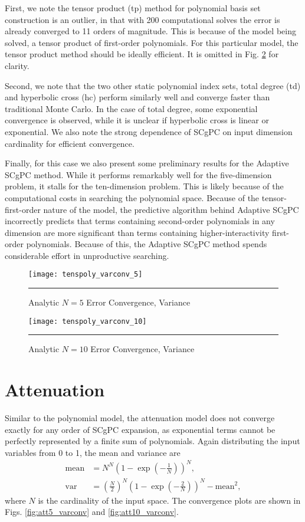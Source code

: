 First, we note the tensor product (tp) method for polynomial basis set construction is an outlier, in that
with 200 computational solves the error is already converged to 11 orders of magnitude.  This is because of
the model being solved, a tensor product of first-order polynomials.  For this particular
model, the tensor product method should be ideally efficient.  It is omitted in Fig.
\ref{fig:anl10_varconv} for clarity.

Second, we note that the two other static polynomial index sets, total degree (td) and hyperbolic cross (hc)
perform similarly well and converge faster than traditional Monte Carlo.  In the case of total degree, some
exponential convergence is observed, while it is unclear if hyperbolic cross is linear or exponential.  We
also note the strong dependence of SCgPC on input dimension cardinality for efficient convergence.

Finally, for this case we
also present some preliminary results for the Adaptive SCgPC method.  While it performs remarkably well for
the five-dimension problem, it stalls for the ten-dimension problem.  This is likely because of the
computational costs in searching the polynomial space.  Because of the tensor-first-order nature of the model,
the predictive algorithm behind Adaptive SCgPC incorrectly predicts that terms containing second-order
polynomials in any dimension are more significant than terms containing higher-interactivity first-order
polynomials.  Because of this, the Adaptive SCgPC method spends considerable effort in unproductive searching.

\begin{figure}[H]
  \centering
    \texttt{[image: tenspoly\_varconv\_5]}
    \rule{35em}{0.5pt}
  \caption{Analytic $N=5$ Error Convergence, Variance}
  \label{fig:anl5_varconv}
\end{figure}
\begin{figure}[H]
  \centering
    \texttt{[image: tenspoly\_varconv\_10]}
    \rule{35em}{0.5pt}
  \caption{Analytic $N=10$ Error Convergence, Variance}
  \label{fig:anl10_varconv}
\end{figure}



\section{Attenuation}
Similar to the polynomial model, the attenuation model does not converge exactly for any order of SCgPC
expansion, as exponential terms cannot be perfectly represented by a finite sum of polynomials.
Again distributing the input variables from 0 to 1, the mean and variance are
\begin{align}
  \text{mean}&=N^N\left(1-\exp(-\frac{1}{N})\right)^N,\\
  \text{var}&=\left(\frac{N}{2}\right)^N \left(1-\exp(-\frac{2}{N})\right)^N - \text{mean}^2,
\end{align}
where $N$ is the cardinality of the input space.  The convergence plots are shown in Figs.
\ref{fig:att5_varconv} and \ref{fig:att10_varconv}.


